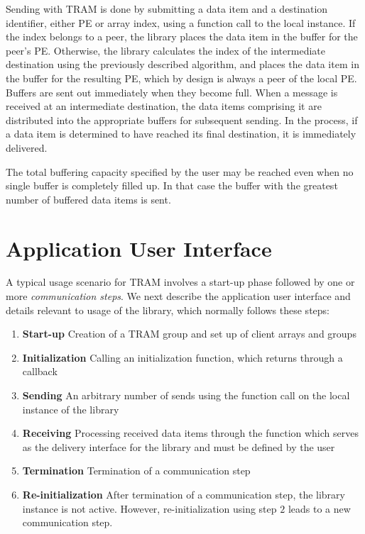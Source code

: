 Sending with TRAM is done by submitting a data item and a
destination identifier, either PE or array index, using a function
call to the local instance.  If the index belongs to a peer, the
library places the data item in the buffer for the peer's
PE. Otherwise, the library calculates the index of the intermediate
destination using the previously described algorithm, and places the
data item in the buffer for the resulting PE, which by design is
always a peer of the local PE. Buffers are sent out immediately
when they become full. When a message is received at an intermediate
destination, the data items comprising it are distributed into the
appropriate buffers for subsequent sending. In the process, if a data
item is determined to have reached its final destination, it is
immediately delivered.

The total buffering capacity specified by the user may be reached even
when no single buffer is completely filled up. In that case the buffer
with the greatest number of buffered data items is sent.

\section{Application User Interface}

A typical usage scenario for TRAM involves a start-up phase followed by one or
more \emph{communication steps}. We next describe the application user interface
and details relevant to usage of the library, which normally follows these
steps:

\begin{enumerate}
\item{\textbf{Start-up}} Creation of a TRAM group and set up of client
  arrays and groups
\item{\textbf{Initialization}} Calling an initialization function,
  which returns through a callback
\item{\textbf{Sending}} An arbitrary number of sends using the
   function call on the local instance of the library
\item{\textbf{Receiving}} Processing received data items through the
   function which serves as the delivery
  interface for the library and must be defined by the user
\item{\textbf{Termination}} Termination of a communication step
\item{\textbf{Re-initialization}} After termination of a communication step, the
  library instance is not active. However, re-initialization using step $2$
  leads to a new communication step.
\end{enumerate}

